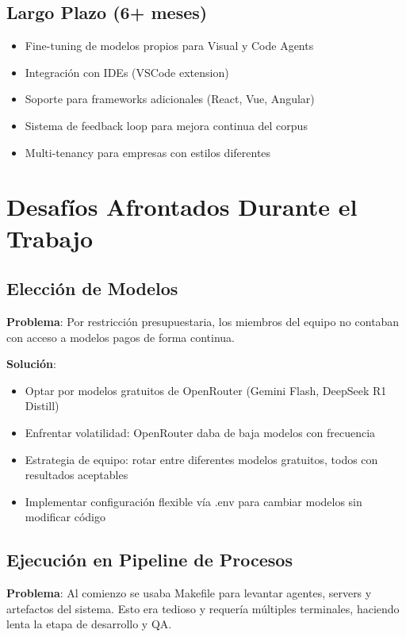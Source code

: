 \documentclass[12pt,a4paper]{article}
\begin{document}
\subsection{Largo Plazo (6+ meses)}

\begin{itemize}
    \item Fine-tuning de modelos propios para Visual y Code Agents
    \item Integración con IDEs (VSCode extension)
    \item Soporte para frameworks adicionales (React, Vue, Angular)
    \item Sistema de feedback loop para mejora continua del corpus
    \item Multi-tenancy para empresas con estilos diferentes
\end{itemize}

\section{Desafíos Afrontados Durante el Trabajo}

\subsection{Elección de Modelos}

\textbf{Problema}: Por restricción presupuestaria, los miembros del equipo no contaban con acceso a modelos pagos de forma continua.

\textbf{Solución}:
\begin{itemize}
    \item Optar por modelos gratuitos de OpenRouter (Gemini Flash, DeepSeek R1 Distill)
    \item Enfrentar volatilidad: OpenRouter daba de baja modelos con frecuencia
    \item Estrategia de equipo: rotar entre diferentes modelos gratuitos, todos con resultados aceptables
    \item Implementar configuración flexible vía .env para cambiar modelos sin modificar código
\end{itemize}

\subsection{Ejecución en Pipeline de Procesos}

\textbf{Problema}: Al comienzo se usaba Makefile para levantar agentes, servers y artefactos del sistema. Esto era tedioso y requería múltiples terminales, haciendo lenta la etapa de desarrollo y QA.
\end{document}
